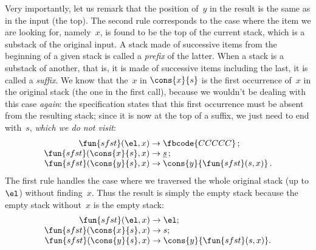 Very importantly, let us remark that the position of~\(y\) in the
result is the same as in the input (the top). The second rule
corresponds to the case where the item we are looking for,
namely~\(x\), is found to be the top of the current stack, which is a
substack of the original input. A stack made of successive items from
the beginning of a given stack is called a \emph{prefix} of the
latter. When a stack is a substack of another, that is, it is made of
successive items including the last, it is called a \emph{suffix}. We
know that the~\(x\) in \(\cons{x}{s}\) is the first occurrence
of~\(x\) in the original stack (the one in the first call), because we
wouldn't be dealing with this case \emph{again}: the specification
states that this first occurrence must be absent from the resulting
stack; since it is now at the top of a suffix, we just need to end
with~\(s\), \emph{which we do not visit}:
\begin{equation*}
\begin{array}{r@{\;}l@{\;}l}
\fun{sfst}(\el,x)         & \rightarrow & \fbcode{CCCCC}\,;\\
\fun{sfst}(\cons{x}{s},x) & \rightarrow & \underline{s}\,;\\
\fun{sfst}(\cons{y}{s},x) & \rightarrow & \cons{y}{\fun{sfst}(s,x)}\,.
\end{array}
\end{equation*}
The first rule handles the case where we traversed the whole original
stack (up to \(\el\)) without finding~\(x\). Thus the result is simply
the empty stack because the empty stack without~\(x\) is the empty
stack:
\begin{equation*}
\begin{array}{r@{\;}l@{\;}l}
\fun{sfst}(\el,x)         & \rightarrow & \el;\\
\fun{sfst}(\cons{x}{s},x) & \rightarrow & s;\\
\fun{sfst}(\cons{y}{s},x) & \rightarrow & \cons{y}{\fun{sfst}(s,x)}.
\end{array}
\end{equation*}

